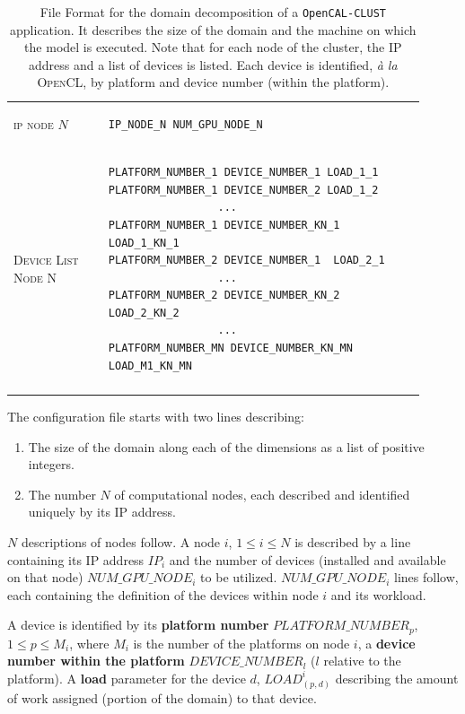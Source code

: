 \begin{table}
\begin{tabular}{m{0.21\linewidth}| m{0.7\linewidth}}
\textsc{ip node $N$}   & 
\begin{verbatim}
IP_NODE_N NUM_GPU_NODE_N
\end{verbatim}
\tabularnewline
\textsc{Device List Node N}  & 
\begin{verbatim}
PLATFORM_NUMBER_1 DEVICE_NUMBER_1 LOAD_1_1
PLATFORM_NUMBER_1 DEVICE_NUMBER_2 LOAD_1_2
                 ...
PLATFORM_NUMBER_1 DEVICE_NUMBER_KN_1 LOAD_1_KN_1
PLATFORM_NUMBER_2 DEVICE_NUMBER_1  LOAD_2_1
                 ...
PLATFORM_NUMBER_2 DEVICE_NUMBER_KN_2 LOAD_2_KN_2
                 ...
PLATFORM_NUMBER_MN DEVICE_NUMBER_KN_MN LOAD_M1_KN_MN
\end{verbatim}
\\ \tabularnewline
\bottomrule
        
\end{tabular}
\caption[File Format for the domain decomposition of a \texttt{OpenCAL-CLUST} application.]{File Format for the domain decomposition of a \texttt{OpenCAL-CLUST} application. It describes the size of the domain and the machine on which the model is executed. Note that for each node of the cluster, the IP address and a list of devices is listed. Each device is identified, \textit{\`a la} \textsc{OpenCL}, by platform and device number (within the platform).}
\label{code:file_syntax}
\end{table}
\captionsetup[table]{name=Table}

The configuration file starts with two lines describing:
\begin{enumerate}
    \item The size of the domain along each of the dimensions as a list of positive integers.
    \item The number $N$ of computational nodes, each described and identified uniquely by its IP address.
\end{enumerate}
$N$ descriptions of nodes follow.
A node $i$, $1 \leq i \leq N$ is described by a line containing its IP address $IP_i$ and the number of devices (installed and available on that node) $NUM\_GPU\_NODE_i$ to be utilized.
$NUM\_GPU\_NODE_i$ lines follow, each containing the definition of the devices within node $i$ and its workload. 

A device is identified by its \textbf{platform number} $PLATFORM\_NUMBER_p$, $1 \leq p \leq M_i$, where $M_i$ is the number of the platforms on node $i$, a \textbf{device number within the platform} $DEVICE\_NUMBER_l$ ($l$ relative to the platform). A \textbf{load} parameter for the device $d$, $LOAD^i_{(p,d)}$ describing the amount of work assigned (portion of the domain) to that device.

